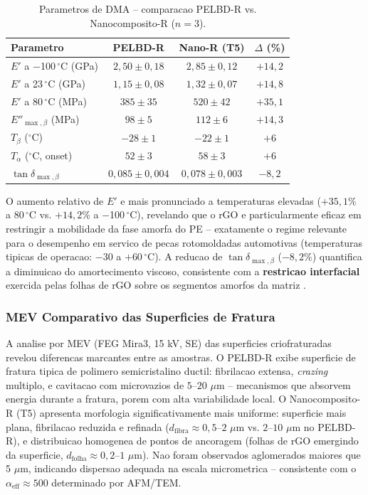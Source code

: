 \documentclass[11pt,a4paper,oneside]{article}
\begin{document}
\begin{table}[H]\centering
\caption{Parametros de DMA -- comparacao PELBD-R vs. Nanocomposito-R ($n{=}3$).}\label{tab:dma}
\begin{tabular}{lccc}
\toprule
{\bfseries Parametro} & {\bfseries PELBD-R} & {\bfseries Nano-R (T5)} & {\bfseries $\Delta$ (\%)} \\
\midrule
$E'$ a $-$100$\,^{\circ}$C (GPa) & $2{,}50{\pm}0{,}18$ & $2{,}85{\pm}0{,}12$ & $+14{,}2$ \\
$E'$ a 23$\,^{\circ}$C (GPa)   & $1{,}15{\pm}0{,}08$ & $1{,}32{\pm}0{,}07$ & $+14{,}8$ \\
$E'$ a 80$\,^{\circ}$C (MPa)   & $385{\pm}35$      & $520{\pm}42$       & $+35{,}1$ \\
$E''_{\max,\beta}$ (MPa)       & $98{\pm}5$        & $112{\pm}6$        & $+14{,}3$ \\
$T_\beta$ ($^{\circ}$C)        & $-28{\pm}1$       & $-22{\pm}1$        & $+6$ \\
$T_\alpha$ ($^{\circ}$C, onset)& $52{\pm}3$        & $58{\pm}3$         & $+6$ \\
$\tan\delta_{\max,\beta}$      & $0{,}085{\pm}0{,}004$ & $0{,}078{\pm}0{,}003$ & $-8{,}2$ \\
\bottomrule
\end{tabular}
\end{table}

O aumento relativo de $E'$ e mais pronunciado a temperaturas elevadas ($+35{,}1\%$ a 80$\,^{\circ}$C vs. $+14{,}2\%$ a $-$100$\,^{\circ}$C), revelando que o rGO e particularmente eficaz em restringir a mobilidade da fase amorfa do PE -- exatamente o regime relevante para o desempenho em servico de pecas rotomoldadas automotivas (temperaturas tipicas de operacao: $-30$ a $+60\,^{\circ}$C). A reducao de $\tan\delta_{\max,\beta}$ ($-8{,}2\%$) quantifica a diminuicao do amortecimento viscoso, consistente com a {\bfseries restricao interfacial} exercida pelas folhas de rGO sobre os segmentos amorfos da matriz \cite{Menard2020}.

\subsubsection{MEV Comparativo das Superficies de Fratura}

A analise por MEV (FEG Mira3, 15 kV, SE) das superficies criofraturadas revelou diferencas marcantes entre as amostras. O PELBD-R exibe superficie de fratura tipica de polimero semicristalino ductil: fibrilacao extensa, \textit{crazing} multiplo, e cavitacao com microvazios de $5$--$20$ $\mu$m -- mecanismos que absorvem energia durante a fratura, porem com alta variabilidade local. O Nanocomposito-R (T5) apresenta morfologia significativamente mais uniforme: superficie mais plana, fibrilacao reduzida e refinada ($d_{\text{fibra}}{\approx}0{,}5$--$2$ $\mu$m vs. $2$--$10$ $\mu$m no PELBD-R), e distribuicao homogenea de pontos de ancoragem (folhas de rGO emergindo da superficie, $d_{\text{folha}}{\approx}0{,}2$--$1$ $\mu$m). Nao foram observados aglomerados maiores que 5 $\mu$m, indicando dispersao adequada na escala micrometrica -- consistente com o $\alpha_{\text{eff}}{\approx}500$ determinado por AFM/TEM.
\end{document}
